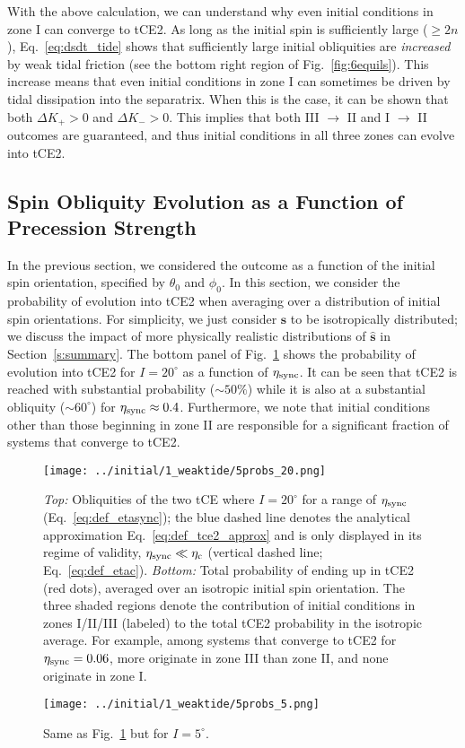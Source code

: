 \documentclass[
        fleqn,
        usenatbib,
    ]{mnras}
\newcommand*{\uv}[1]{\hat{\mathbf{#1}}}
\begin{document}
With the above calculation, we can understand why even initial conditions in
zone I can converge to tCE2. As long as the initial spin is sufficiently large
($\geq 2n$), Eq.~\eqref{eq:dsdt_tide} shows that sufficiently large initial
obliquities are \emph{increased} by weak tidal friction (see the bottom right
region of Fig.~\ref{fig:6equils}). This increase means that even initial
conditions in zone I can sometimes be driven by tidal dissipation into the
separatrix. When this is the case, it can be shown that both $\Delta K_+ > 0$
and $\Delta K_- > 0$. This implies that both III $\to$ II and I $\to$ II
outcomes are guaranteed, and thus initial conditions in all three zones can
evolve into tCE2.

\subsection{Spin Obliquity Evolution as a Function of Precession Strength
}\label{ss:tce2_etasync}

In the previous section, we considered the outcome as a function of the initial
spin orientation, specified by $\theta_0$ and $\phi_0$. In this section, we
consider the probability of evolution into tCE2 when averaging over a
distribution of initial spin orientations. For simplicity, we just consider
$\uv{s}$ to be isotropically distributed; we discuss the impact of more
physically realistic distributions of $\uv{s}$ in Section~\ref{s:summary}. The
bottom panel of Fig.~\ref{fig:probs20} shows the probability of evolution into
tCE2 for $I = 20^\circ$ as a function of $\eta_{\rm sync}$. It can be seen that
tCE2 is reached with substantial probability ($\sim 50\%$) while it is also
at a substantial obliquity ($\sim 60^\circ$) for $\eta_{\rm sync} \approx 0.4$.
Furthermore, we note that initial conditions other than those beginning in zone
II are responsible for a significant fraction of systems that converge to tCE2.
\begin{figure}
    \centering
    \texttt{[image: ../initial/1\_weaktide/5probs\_20.png]}
    \caption{\emph{Top:} Obliquities of the two tCE where $I = 20^\circ$ for a
    range of $\eta_{\rm sync}$ (Eq.~\ref{eq:def_etasync}); the blue dashed line
    denotes the analytical approximation Eq.~\eqref{eq:def_tce2_approx} and is
    only displayed in its regime of validity, $\eta_{\rm sync} \ll \eta_{\rm c}$
    (vertical dashed line; Eq.~\ref{eq:def_etac}). \emph{Bottom:} Total
    probability of ending up in tCE2 (red dots), averaged over an isotropic
    initial spin orientation. The three shaded regions denote the contribution
    of initial conditions in zones I/II/III (labeled) to the total tCE2
    probability in the isotropic average. For example, among systems that
    converge to tCE2 for $\eta_{\rm sync} = 0.06$, more originate in zone III
    than zone II, and none originate in zone I.}\label{fig:probs20}
\end{figure}
\begin{figure}
    \centering
    \texttt{[image: ../initial/1\_weaktide/5probs\_5.png]}
    \caption{Same as Fig.~\ref{fig:probs20} but for $I =
    5^\circ$.}\label{fig:probs5}
\end{figure}
\end{document}
